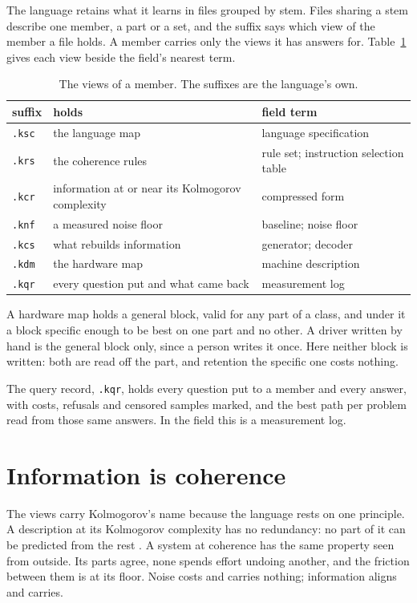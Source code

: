 The language retains what it learns in files grouped by stem. Files sharing a stem describe one
member, a part or a set, and the suffix says which view of the member a file holds. A member
carries only the views it has answers for. Table~\ref{tab:kfiles} gives each view beside the
field's nearest term.

\begin{table}[h]
\centering
\small
\begin{tabular}{@{}l l l@{}}
\toprule
suffix & holds & field term \\
\midrule
\texttt{.ksc} & the language map & language specification \\
\texttt{.krs} & the coherence rules & rule set; instruction selection table \\
\texttt{.kcr} & information at or near its Kolmogorov complexity & compressed form \\
\texttt{.knf} & a measured noise floor & baseline; noise floor \\
\texttt{.kcs} & what rebuilds information & generator; decoder \\
\texttt{.kdm} & the hardware map & machine description \\
\texttt{.kqr} & every question put and what came back & measurement log \\
\bottomrule
\end{tabular}
\caption{The views of a member. The suffixes are the language's own.}
\label{tab:kfiles}
\end{table}

A hardware map holds a general block, valid for any part of a class, and under it a block
specific enough to be best on one part and no other. A driver written by hand is the general
block only, since a person writes it once. Here neither block is written: both are read off the
part, and retention the specific one costs nothing.

The query record, \texttt{.kqr}, holds every question put to a member and every answer, with costs,
refusals and censored samples marked, and the best path per problem read from those same answers. In
the field this is a measurement log.

\section{Information is coherence}

The views carry Kolmogorov's name because the language rests on one principle. A description at
its Kolmogorov complexity has no redundancy: no part of it can be predicted from the rest
\cite{src:Kolmogorov}. A system at coherence has the same property seen from outside. Its parts
agree, none spends effort undoing another, and the friction between them is at its floor. Noise
costs and carries nothing; information aligns and carries.

